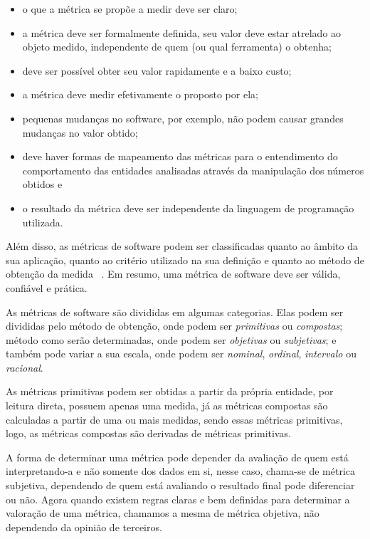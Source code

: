 \begin{itemize}
  \item o que a métrica se propõe a medir deve ser claro;
  \item a métrica deve ser formalmente definida, seu valor deve estar atrelado ao objeto medido, independente de quem (ou 
    qual ferramenta) o obtenha;
  \item deve ser possível obter seu valor rapidamente e a baixo custo;
  \item a métrica deve medir efetivamente o proposto por ela;
  \item pequenas mudanças no software, por exemplo, não podem causar grandes mudanças no valor obtido;
  \item deve haver formas de mapeamento das métricas para o entendimento do comportamento das entidades analisadas através 
    da manipulação dos números obtidos e
  \item o resultado da métrica deve ser independente da linguagem de programação utilizada.
\end{itemize}

Além disso, as métricas de software podem ser classificadas quanto ao âmbito da sua aplicação, quanto ao critério utilizado 
na sua definição e quanto ao método de obtenção da medida ~\cite{meirelles2013}. Em resumo, uma métrica de software deve
ser válida, confiável e prática.

As métricas de software são divididas em algumas categorias. Elas podem ser divididas pelo método de obtenção, onde podem
ser \textit{primitivas} ou \textit{compostas}; método como serão determinadas, onde podem ser \textit{objetivas} ou 
\textit{subjetivas}; e também pode variar a sua escala, onde podem ser \textit{nominal}, \textit{ordinal}, \textit{intervalo}
ou \textit{racional}.

As métricas primitivas podem ser obtidas a partir da própria entidade, por leitura direta, possuem apenas uma medida, já as
métricas compostas são calculadas a partir de uma ou mais medidas, sendo essas métricas primitivas, logo, as métricas compostas
são derivadas de métricas primitivas. 

A forma de determinar uma métrica pode depender da avaliação de quem está interpretando-a e não somente dos dados em si, nesse
caso, chama-se de métrica subjetiva, dependendo de quem está avaliando o resultado final pode diferenciar ou não. Agora quando
existem regras claras e bem definidas para determinar a valoração de uma métrica, chamamos a mesma de métrica objetiva, não
dependendo da opinião de terceiros.

